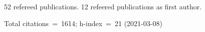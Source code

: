 52 refereed publications. 12 refeered publications as first author.

Total citations~=~1614; h-index~=~21 (2021-03-08)